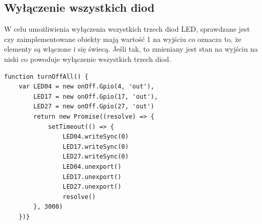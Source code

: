 \subsection{Wyłączenie wszystkich diod}
W celu umożliwienia wyłączenia wszystkich trzech diod LED, sprawdzane jest czy zaimplementowane obiekty mają wartość 1 na wyjściu co oznacza to, że elementy są włączone i się świecą. Jeśli tak, to zmieniany jest stan na wyjściu na niski co powoduje wyłączenie wszystkich trzech diod. 
 \begin{lstlisting}[caption=Implementacja funkcji wyłączająca wszystkie diody]
function turnOffAll() {
    var LED04 = new onOff.Gpio(4, 'out'),
        LED17 = new onOff.Gpio(17, 'out'),
        LED27 = new onOff.Gpio(27, 'out')
        return new Promise((resolve) => {
        	setTimeout(() => {
	            LED04.writeSync(0)
	            LED17.writeSync(0)
	            LED27.writeSync(0)
	            LED04.unexport()
	            LED17.unexport()
	            LED27.unexport()
	            resolve()
        }, 3000)
    })}
\end{lstlisting}

